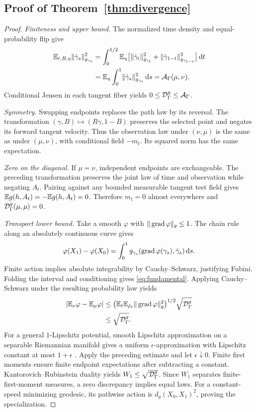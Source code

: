 \subsection{Proof of Theorem~\ref{thm:divergence}}
\begin{proof}
\emph{Finiteness and upper bound.} The normalized time density and equal-probability flip give
\begin{align}
\E_{t,B,\eta}\norm{g_{\gamma_s}}{\dot\gamma_s}^2
&=\int_0^{1/2}\E_\eta\big[\norm{g_{\gamma_t}}{\dot\gamma_t}^2
+\norm{g_{\gamma_{1-t}}}{\dot\gamma_{1-t}}^2\big]\dd t\notag\\
&=\E_\eta\int_0^1\norm{g_{\gamma_s}}{\dot\gamma_s}^2\dd s
=\mathcal A_\Gamma(\mu,\nu).
\end{align}
Conditional Jensen in each tangent fiber yields $0\leq\D_\Gamma^g\leq\mathcal A_\Gamma$.

\emph{Symmetry.} Swapping endpoints replaces the path law by its reversal. The transformation $(\gamma,B)\mapsto(R\gamma,1-B)$ preserves the selected point and negates its forward tangent velocity. Thus the observation law under $(\nu,\mu)$ is the same as under $(\mu,\nu)$, with conditional field $-m_t$. Its squared norm has the same expectation.

\emph{Zero on the diagonal.} If $\mu=\nu$, independent endpoints are exchangeable. The preceding transformation preserves the joint law of time and observation while negating $A_t$. Pairing against any bounded measurable tangent test field gives $\E g(h,A_t)=-\E g(h,A_t)=0$. Therefore $m_t=0$ almost everywhere and $\D_\Gamma^g(\mu,\mu)=0$.

\emph{Transport lower bound.} Take a smooth $\varphi$ with $\|\grad\varphi\|_g\leq1$. The chain rule along an absolutely continuous curve gives
\begin{equation}
\varphi(X_1)-\varphi(X_0)=\int_0^1g_{\gamma_s}(\grad\varphi(\gamma_s),\dot\gamma_s)\dd s.
\end{equation}
Finite action implies absolute integrability by Cauchy--Schwarz, justifying Fubini. Folding the interval and conditioning gives \cref{eq:fundamental}. Applying Cauchy--Schwarz under the resulting probability law yields
\begin{align}
\left|\E_\nu\varphi-\E_\mu\varphi\right|
&\leq\big(\E_t\E_{\bar\rho_t}\|\grad\varphi\|_g^2\big)^{1/2}
\sqrt{\D_\Gamma^g}\notag\\
&\leq\sqrt{\D_\Gamma^g}.
\end{align}
For a general $1$-Lipschitz potential, smooth Lipschitz approximation on a separable Riemannian manifold gives a uniform $\epsilon$-approximation with Lipschitz constant at most $1+\epsilon$ \citep{azagra2007smooth}. Apply the preceding estimate and let $\epsilon\downarrow0$. Finite first moments ensure finite endpoint expectations after subtracting a constant. Kantorovich--Rubinstein duality yields $W_1\leq\sqrt{\D_\Gamma^g}$. Since $W_1$ separates finite-first-moment measures, a zero discrepancy implies equal laws. For a constant-speed minimizing geodesic, its pathwise action is $d_g(X_0,X_1)^2$, proving the specialization.
\end{proof}

